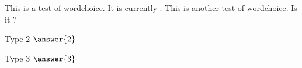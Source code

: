 \documentclass{ximera}
\begin{document}
\begin{exercise}
  This is a test of wordchoice. It is currently
  .  This is
  another test of wordchoice. Is it ?
\end{exercise}

\begin{exercise}
  Type $2$ $\answer{2}$
  \begin{hint}
    Type $3$ $\answer{3}$
  \end{hint}
\end{exercise}
\end{document}
